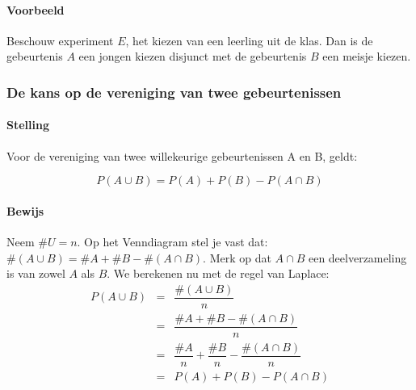 \documentclass[12pt,twoside]{article}
\begin{document}
\paragraph*{Voorbeeld}
Beschouw experiment $E$, het kiezen van een leerling uit de klas. Dan is de gebeurtenis $A$ een jongen kiezen disjunct met de gebeurtenis $B$ een meisje kiezen.

\pagebreak
\begin{samepage}
\subsubsection{De kans op de vereniging van twee gebeurtenissen}

\paragraph*{Stelling }Voor de vereniging van twee willekeurige gebeurtenissen A en B, geldt:\\
\begin{mdframed}
$$P(A \cup B) = P(A) + P(B) - P(A \cap B)$$
\end{mdframed}

\paragraph*{Bewijs}
\begin{center}
\end{center}
Neem $\#U = n$. Op het Venndiagram stel je vast dat: $\#(A\cup B)=\#A + \#B - \#(A\cap B)$. Merk op dat $A \cap B$ een deelverzameling is van zowel $A$ als $B$. We berekenen nu met de regel van Laplace:
\begin{eqnarray*}
  P(A \cup B) &=& \dfrac{\#(A \cup B)}{n}\\
              &=& \dfrac{\#A + \#B - \#(A\cap B)}{n}\\
              &=& \dfrac{\#A}{n} + \dfrac{\#B}{n} - \dfrac{\#(A\cap B)}{n}\\
              &=& P(A) + P(B) - P(A\cap B)
\end{eqnarray*}
\end{samepage}
\end{document}
